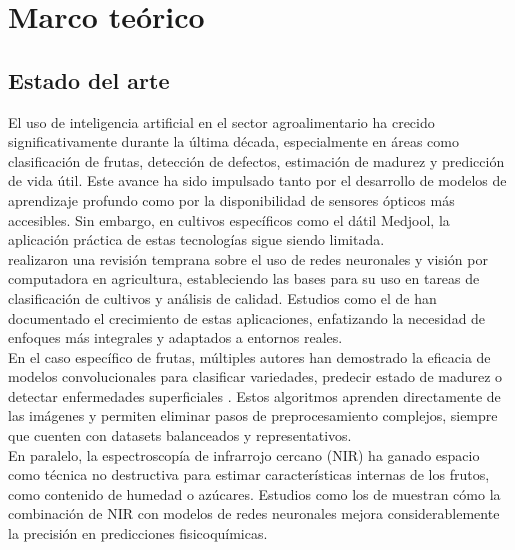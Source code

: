 
\chapter{Marco teórico}

\label{Chapter3}


\section{Estado del arte}

El uso de inteligencia artificial en el sector agroalimentario ha crecido significativamente durante la última década, especialmente en áreas como clasificación de frutas, detección de defectos, estimación de madurez y predicción de vida útil. Este avance ha sido impulsado tanto por el desarrollo de modelos de aprendizaje profundo como por la disponibilidad de sensores ópticos más accesibles. Sin embargo, en cultivos específicos como el dátil Medjool, la aplicación práctica de estas tecnologías sigue siendo limitada.\\

\parencite{kamilaris_deep_2018} realizaron una revisión temprana sobre el uso de redes neuronales y visión por computadora en agricultura, estableciendo las bases para su uso en tareas de clasificación de cultivos y análisis de calidad. Estudios como el de \parencite{garcia_vazquez_scientometric_2021, upadhyay_artificial_2025} han documentado el crecimiento de estas aplicaciones, enfatizando la necesidad de enfoques más integrales y adaptados a entornos reales.\\

En el caso específico de frutas, múltiples autores han demostrado la eficacia de modelos convolucionales para clasificar variedades, predecir estado de madurez o detectar enfermedades superficiales \parencite{rybacki_convolutional_2024, gill_fruit_2023, almomen_date_2023}. Estos algoritmos aprenden directamente de las imágenes y permiten eliminar pasos de preprocesamiento complejos, siempre que cuenten con datasets balanceados y representativos.\\

En paralelo, la espectroscopía de infrarrojo cercano (NIR) ha ganado espacio como técnica no destructiva para estimar características internas de los frutos, como contenido de humedad o azúcares. Estudios como los de \parencite{yuan_determination_2025, wang_improving_2025, chen_prediction_2024} muestran cómo la combinación de NIR con modelos de redes neuronales mejora considerablemente la precisión en predicciones fisicoquímicas.\\

